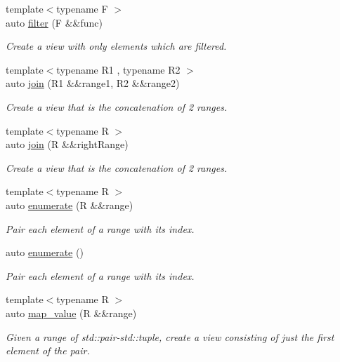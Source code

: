 \begin{DoxyCompactItemize}
{\footnotesize template$<$typename F $>$ }\\auto \mbox{\hyperlink{namespacerah_1_1view_aa52c6f5cff4e0a4f0ed48c66e1039e3d}{filter}} (F \&\&func)
\begin{DoxyCompactList}\small\item\em Create a view with only elements which are filtered. \end{DoxyCompactList}\item 
{\footnotesize template$<$typename R1 , typename R2 $>$ }\\auto \mbox{\hyperlink{namespacerah_1_1view_af66edb5fcde9f79ebd69fce81df0e883}{join}} (R1 \&\&range1, R2 \&\&range2)
\begin{DoxyCompactList}\small\item\em Create a view that is the concatenation of 2 ranges. \end{DoxyCompactList}\item 
{\footnotesize template$<$typename R $>$ }\\auto \mbox{\hyperlink{namespacerah_1_1view_a9311214c2d98f420e73b679e02bd7f7f}{join}} (R \&\&right\+Range)
\begin{DoxyCompactList}\small\item\em Create a view that is the concatenation of 2 ranges. \end{DoxyCompactList}\item 
{\footnotesize template$<$typename R $>$ }\\auto \mbox{\hyperlink{namespacerah_1_1view_a3400a50c2b0e90330850128c2b7605d0}{enumerate}} (R \&\&range)
\begin{DoxyCompactList}\small\item\em Pair each element of a range with its index. \end{DoxyCompactList}\item 
auto \mbox{\hyperlink{namespacerah_1_1view_a592731562abd27c9c71f744885322545}{enumerate}} ()
\begin{DoxyCompactList}\small\item\em Pair each element of a range with its index. \end{DoxyCompactList}\item 
{\footnotesize template$<$typename R $>$ }\\auto \mbox{\hyperlink{namespacerah_1_1view_abde9f999ff37f8b31f7a25598f2b4a25}{map\+\_\+value}} (R \&\&range)
\begin{DoxyCompactList}\small\item\em Given a range of std\+::pair-\/std\+::tuple, create a view consisting of just the first element of the pair. \end{DoxyCompactList}\item 

\end{DoxyCompactItemize}

